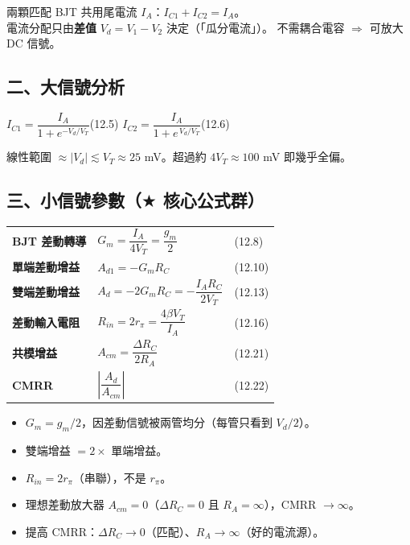\documentclass[10pt]{article}
\begin{document}
兩顆匹配 BJT 共用尾電流 $I_A$：$I_{C1}+I_{C2}=I_A$。\\
電流分配只由\textbf{差值} $V_d = V_1 - V_2$ 決定（「瓜分電流」）。
不需耦合電容 $\Rightarrow$ 可放大 DC 信號。

\subsection*{二、大信號分析}

\begin{formulabox}
$I_{C1} = \dfrac{I_A}{1+e^{-V_d/V_T}}$\hfill(12.5)\qquad
$I_{C2} = \dfrac{I_A}{1+e^{\,V_d/V_T}}$\hfill(12.6)
\end{formulabox}

線性範圍 $\approx |V_d| \lesssim V_T \approx 25$ mV。超過約 $4V_T \approx 100$ mV 即幾乎全偏。

\subsection*{三、小信號參數（$\bigstar$ 核心公式群）}

\begin{formulabox}
\renewcommand{\arraystretch}{1.8}
\begin{tabular}{@{}p{4.8cm}@{\quad}l@{\qquad}l@{}}
\textbf{BJT 差動轉導} & $G_m = \dfrac{I_A}{4V_T} = \dfrac{g_m}{2}$ & (12.8) \\
\textbf{單端差動增益} & $A_{d1} = -G_m R_C$ & (12.10) \\
\textbf{雙端差動增益} & $A_d = -2G_m R_C = -\dfrac{I_A R_C}{2V_T}$ & (12.13) \\
\textbf{差動輸入電阻} & $R_{in} = 2r_\pi = \dfrac{4\beta V_T}{I_A}$ & (12.16) \\
\textbf{共模增益} & $A_{cm} = \dfrac{\Delta R_C}{2R_A}$ & (12.21) \\
\textbf{CMRR} & $\left|\dfrac{A_d}{A_{cm}}\right|$ & (12.22)
\end{tabular}
\end{formulabox}

\begin{trapbox}[常見考點]
\begin{itemize}[leftmargin=1.8em,itemsep=0pt,topsep=1pt]
\item $G_m = g_m/2$，因差動信號被兩管均分（每管只看到 $V_d/2$）。
\item 雙端增益 $= 2\times$ 單端增益。
\item $R_{in} = 2r_\pi$（串聯），不是 $r_\pi$。
\item 理想差動放大器 $A_{cm}=0$（$\Delta R_C=0$ 且 $R_A=\infty$），CMRR $\to \infty$。
\item 提高 CMRR：$\Delta R_C \to 0$（匹配）、$R_A \to \infty$（好的電流源）。
\end{itemize}
\end{trapbox}
\end{document}
